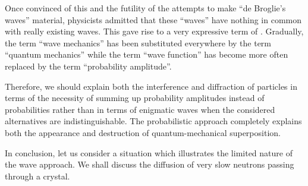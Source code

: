Once convinced of this and the futility of the attempts to make ``de
Broglie's waves'' material, physicists admitted that these ``waves'' have
nothing in common with really existing waves. This gave rise to a very
expressive term of . Gradually, the term ``wave
mechanics'' has been substituted everywhere by the term ``quantum
mechanics'' while the term ``wave function'' has become more often
replaced by the term ``probability amplitude''.

Therefore, we should explain both the interference and diffraction of
particles in terms of the necessity of summing up probability amplitudes
instead of probabilities rather than in terms of enigmatic waves when
the considered alternatives are indistinguishable. The probabilistic
approach completely explains both the appearance and destruction of
quantum-mechanical superposition.

In conclusion, let us consider a situation which illustrates the limited
nature of the wave approach. We shall discuss the diffusion of very slow
neutrons passing through a crystal.

